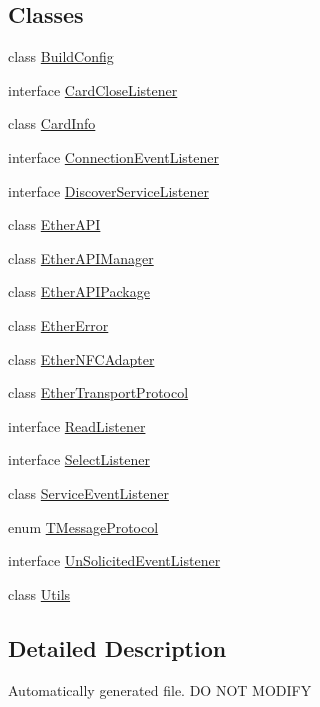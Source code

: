 \subsection*{Classes}
\begin{DoxyCompactItemize}
\item 
class \mbox{\hyperlink{classcom_1_1ethernom_1_1android_1_1etherapi_1_1_build_config}{Build\+Config}}
\item 
interface \mbox{\hyperlink{interfacecom_1_1ethernom_1_1android_1_1etherapi_1_1_card_close_listener}{Card\+Close\+Listener}}
\item 
class \mbox{\hyperlink{classcom_1_1ethernom_1_1android_1_1etherapi_1_1_card_info}{Card\+Info}}
\item 
interface \mbox{\hyperlink{interfacecom_1_1ethernom_1_1android_1_1etherapi_1_1_connection_event_listener}{Connection\+Event\+Listener}}
\item 
interface \mbox{\hyperlink{interfacecom_1_1ethernom_1_1android_1_1etherapi_1_1_discover_service_listener}{Discover\+Service\+Listener}}
\item 
class \mbox{\hyperlink{classcom_1_1ethernom_1_1android_1_1etherapi_1_1_ether_a_p_i}{Ether\+A\+PI}}
\item 
class \mbox{\hyperlink{classcom_1_1ethernom_1_1android_1_1etherapi_1_1_ether_a_p_i_manager}{Ether\+A\+P\+I\+Manager}}
\item 
class \mbox{\hyperlink{classcom_1_1ethernom_1_1android_1_1etherapi_1_1_ether_a_p_i_package}{Ether\+A\+P\+I\+Package}}
\item 
class \mbox{\hyperlink{classcom_1_1ethernom_1_1android_1_1etherapi_1_1_ether_error}{Ether\+Error}}
\item 
class \mbox{\hyperlink{classcom_1_1ethernom_1_1android_1_1etherapi_1_1_ether_n_f_c_adapter}{Ether\+N\+F\+C\+Adapter}}
\item 
class \mbox{\hyperlink{classcom_1_1ethernom_1_1android_1_1etherapi_1_1_ether_transport_protocol}{Ether\+Transport\+Protocol}}
\item 
interface \mbox{\hyperlink{interfacecom_1_1ethernom_1_1android_1_1etherapi_1_1_read_listener}{Read\+Listener}}
\item 
interface \mbox{\hyperlink{interfacecom_1_1ethernom_1_1android_1_1etherapi_1_1_select_listener}{Select\+Listener}}
\item 
class \mbox{\hyperlink{classcom_1_1ethernom_1_1android_1_1etherapi_1_1_service_event_listener}{Service\+Event\+Listener}}
\item 
enum \mbox{\hyperlink{enumcom_1_1ethernom_1_1android_1_1etherapi_1_1_t_message_protocol}{T\+Message\+Protocol}}
\item 
interface \mbox{\hyperlink{interfacecom_1_1ethernom_1_1android_1_1etherapi_1_1_un_solicited_event_listener}{Un\+Solicited\+Event\+Listener}}
\item 
class \mbox{\hyperlink{classcom_1_1ethernom_1_1android_1_1etherapi_1_1_utils}{Utils}}
\end{DoxyCompactItemize}


\subsection{Detailed Description}
Automatically generated file. DO N\+OT M\+O\+D\+I\+FY 